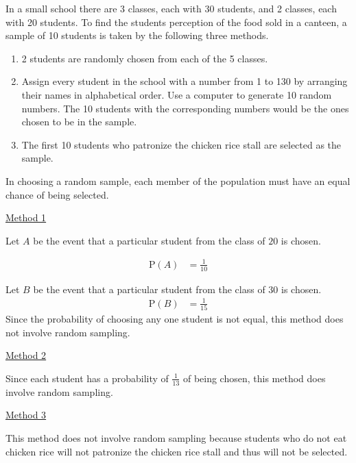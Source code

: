 \documentclass[11pt,a4paper]{book}
\begin{document}
\begin{example}

In a small school there are 3 classes, each with 30 students, and
2 classes, each with 20 students. To find the students perception
of the food sold in a canteen, a sample of 10 students is taken by
the following three methods.

\begin{enumerate}[label=Method \arabic*:, leftmargin=2cm]

\item  2 students are randomly chosen from each of the 5 classes.

\item  Assign every student in the school with a number from 1 to
130 by arranging their names in alphabetical order. Use a computer
to generate 10 random numbers. The 10 students with the corresponding
numbers would be the ones chosen to be in the sample.

\item  The first 10 students who patronize the chicken rice stall
are selected as the sample.

\end{enumerate}

\Solution

In choosing a random sample, each member of the population must have an equal chance of being selected.

\uline{Method 1}

Let $A$ be the event that a particular student from the class of
$20$ is chosen.

\begin{align*}
\text{P}\left(A\right) & =\frac{1}{10}
\end{align*}

Let $B$ be the event that a particular student from the class of
$30$ is chosen.
\begin{align*}
\text{P}\left(B\right) & =\frac{1}{15}
\end{align*}
Since the probability of choosing any one student is not equal, this
method does not involve random sampling.

\uline{Method 2}

Since each student has a probability of ${\displaystyle \frac{1}{13}}$
of being chosen, this method does involve random sampling.

\uline{Method 3}

This method does not involve random sampling because students who
do not eat chicken rice will not patronize the chicken rice stall
and thus will not be selected.

\end{example}
\end{document}
